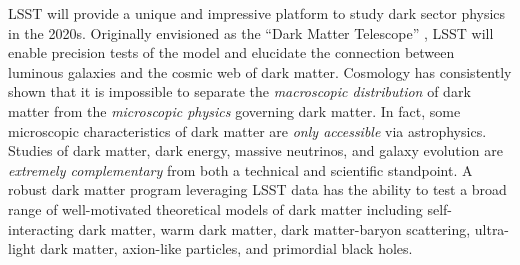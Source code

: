 \documentclass[12pt]{article}
\begin{document}
LSST will provide a unique and impressive platform to study dark sector physics in the 2020s.
Originally envisioned as the ``Dark Matter Telescope'' \citep{Tyson:2001}, LSST will enable precision tests of the \LCDM model and elucidate the connection between luminous galaxies and the cosmic web of dark matter. 
Cosmology has consistently shown that it is impossible to separate the \emph{macroscopic distribution} of dark matter from the \emph{microscopic physics} governing dark matter.
In fact, some microscopic characteristics of dark matter are \emph{only accessible} via astrophysics.
Studies of dark matter, dark energy, massive neutrinos, and galaxy evolution are \emph{extremely complementary} from both a technical and scientific standpoint. 
A robust dark matter program leveraging LSST data has the ability to test a broad range of well-motivated theoretical models of dark matter including self-interacting dark matter, warm dark matter, dark matter-baryon scattering, ultra-light dark matter, axion-like particles, and primordial black holes. 
\end{document}

